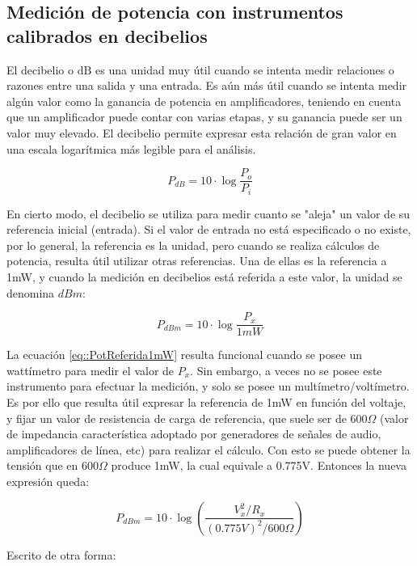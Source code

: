 \vspace{1.5cm}
\subsection{Medición de potencia con instrumentos calibrados en decibelios}

El decibelio o $\mathrm{dB}$ es una unidad muy útil cuando se intenta medir relaciones o razones entre una salida y una entrada. Es aún más útil cuando se intenta medir algún valor como la ganancia de potencia en amplificadores, teniendo en cuenta que un amplificador puede contar con varias etapas, y su ganancia puede ser un valor muy elevado. El decibelio permite expresar esta relación de gran valor en una escala logarítmica más legible para el análisis.

\begin{equation}
    P_{dB} = 10\cdot\log{\frac{P_o}{P_i}}
\end{equation}

En cierto modo, el decibelio se utiliza para medir cuanto se "aleja" un valor de su referencia inicial (entrada). Si el valor de entrada no está especificado o no existe, por lo general, la referencia es la unidad, pero cuando se realiza cálculos de potencia, resulta útil utilizar otras referencias. Una de ellas es la referencia a 1mW, y cuando la medición en decibelios está referida a este valor, la unidad se denomina $dBm$:

\begin{equation}\label{eq::PotReferida1mW}
     P_{dBm} = 10\cdot\log{\frac{P_x}{1mW}}
\end{equation}

La ecuación \ref{eq::PotReferida1mW} resulta funcional cuando se posee un wattímetro para medir el valor de $P_x$. Sin embargo, a veces no se posee este instrumento para efectuar la medición, y solo se posee un multímetro/voltímetro. Es por ello que resulta útil expresar la referencia de 1mW en función del voltaje, y fijar un valor de resistencia de carga de referencia, que suele ser de $600 \Omega$ (valor de impedancia característica adoptado por generadores de señales de audio, amplificadores de línea, etc) para realizar el cálculo. Con esto se puede obtener la tensión que en $600\Omega$ produce 1mW, la cual equivale a 0.775V. Entonces la nueva expresión queda:

$$   P_{dBm} = 10\cdot\log\left({\frac{V_x^2 / R_x}{(0.775V)^2/600\Omega}}\right)$$

Escrito de otra forma:


